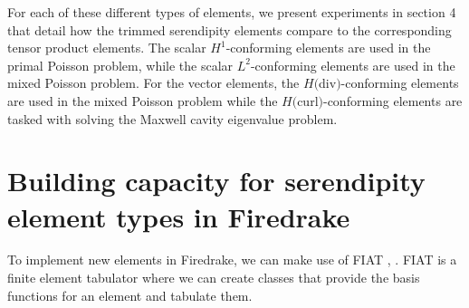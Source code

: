 \documentclass[manuscript,screen]{acmart}
\newcommand\akg[1]{\textbf{\textcolor[rgb]{.5,0,1}{[Andrew: #1]}}}
\newcommand{\calS}{\mathcal{S}}
\newcommand{\hcurl}{$H($curl$)$}
\newcommand{\hdiv}{$H($div$)$}
\begin{document}
%	
%
%	
%  
%	
%
%
%  
%  
  
  For each of these different types of elements, we present experiments in section 4 that detail how the trimmed serendipity elements compare to the corresponding tensor product elements.  The scalar $H^1$-conforming elements are used in the primal Poisson problem, while the scalar $L^2$-conforming elements are used in the mixed Poisson problem.  For the vector elements, the \hdiv-conforming elements are used in the mixed Poisson problem while the \hcurl-conforming elements are tasked with solving the Maxwell cavity eigenvalue problem.
  
  
  \section{Building capacity for serendipity element types in Firedrake}
  \label{sec:buildcap}
  
  To implement new elements in Firedrake, we can make use of FIAT  \cite{kirby2004algorithm}, \cite{kirby2012fiat}.  FIAT is a finite element tabulator where we can create classes that provide the basis functions for an element and tabulate them.  
  
\end{document}
